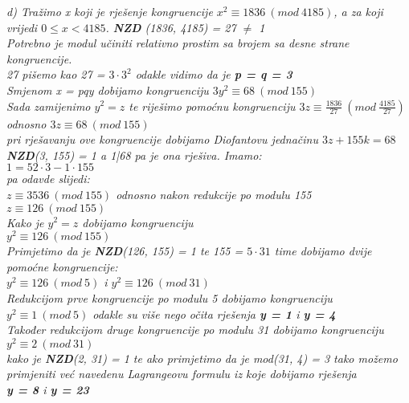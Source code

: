 \documentclass[12pt]{article}
\begin{document}
\begin{enumerate}
\begin{center}
               
                      \textit{d) Tražimo x koji je rješenje kongruencije $x^2 \equiv  1836\ (mod\ 4185)$, a za koji vrijedi $0 \leq x < 4185$. \textbf{NZD} (1836, 4185) = 27 $\neq$ 1\\Potrebno je modul učiniti relativno prostim sa brojem sa desne strane kongruencije.\\27 pišemo kao 27 = $3\cdot3^2$ odakle vidimo da je \textbf{p = q = 3}\\ \vspace{0.15cm}
                      Smjenom x = pqy dobijamo kongruenciju $3y^2 \equiv 68 \ (mod\ 155)$\\Sada zamijenimo $y^2 = z$ te riješimo pomoćnu kongruenciju $3z \equiv \frac{1836}{27} \ (mod\ \frac{4185}{27})$\\
                      odnosno  $3z \equiv 68 \ (mod\ 155)$\\
                      pri rješavanju ove kongruencije dobijamo Diofantovu jednačinu $3z + 155k = 68$\\
                      \textbf{NZD}(3, 155) = 1 a 1|68 pa je ona rješiva. Imamo: \\ $1 = 52\cdot3 - 1\cdot155$\\ pa odavde slijedi: \\ \vspace{0.15cm} $z \equiv 3536 \ (mod\ 155)$ odnosno nakon redukcije po modulu 155 \\$z \equiv 126 \ (mod\ 155)$\\
                      }
                      \vspace{0.25cm}
                      \textit{Kako je $y^2 = z$ dobijamo kongruenciju\\ $y^2 \equiv 126 \ (mod\ 155)$\\Primjetimo da je \textbf{NZD}(126, 155) = 1 te 155 = $5 \cdot 31$ time dobijamo dvije pomoćne kongruencije:\\ \vspace{0.15cm}}
            \textit{$y^2 \equiv 126 \ (mod\ 5)$ i $y^2 \equiv 126 \ (mod\ 31)$\\ \vspace{0.15} Redukcijom prve kongruencije po modulu 5 dobijamo kongruenciju $y^2 \equiv 1 \ (mod\ 5)$ odakle su više nego očita rješenja \textbf{y = 1} i \textbf{y = 4}\\ \vspace{0.15cm}
            Također redukcijom druge kongruencije po modulu 31 dobijamo kongruenciju $y^2 \equiv 2 \ (mod\ 31)$\\
            kako je \textbf{NZD}(2, 31) = 1
           te ako primjetimo da je mod(31, 4) = 3 tako možemo primjeniti već navedenu Lagrangeovu formulu iz koje dobijamo rješenja\\
           \textbf{y = 8} i \textbf{y = 23}\\}
           

\end{center}
\end{enumerate}
\end{document}
